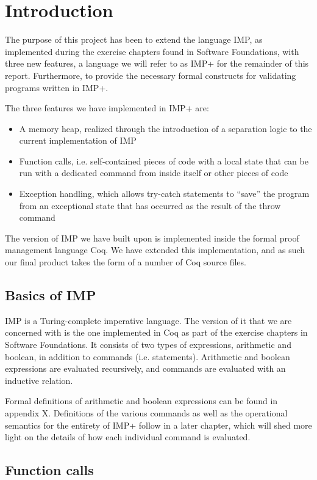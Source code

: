 \section{Introduction}
The purpose of this project has been to extend the language IMP, as implemented during the exercise chapters found in Software Foundations, with three new features, a language we will refer to as IMP+ for the remainder of this report. Furthermore, to provide the necessary formal constructs for validating programs written in IMP+.

The three features we have implemented in IMP+ are:
\begin{itemize}
\item A memory heap, realized through the introduction of a separation logic to the current implementation of IMP
\item Function calls, i.e. self-contained pieces of code with a local state that can be run with a dedicated command from inside itself or other pieces of code
\item Exception handling, which allows try-catch statements to “save” the program from an exceptional state that has occurred as the result of the throw command
\end{itemize}

The version of IMP we have built upon is implemented inside the formal proof management language Coq. We have extended this implementation, and as such our final product takes the form of a number of Coq source files.

\subsection{Basics of IMP}
IMP is a Turing-complete imperative language. The version of it that we are concerned with is the one implemented in Coq as part of the exercise chapters in Software Foundations. It consists of two types of expressions, arithmetic and boolean, in addition to commands (i.e. statements). Arithmetic and boolean expressions are evaluated recursively, and commands are evaluated with an inductive relation.

Formal definitions of arithmetic and boolean expressions can be found in appendix X. Definitions of the various commands as well as the operational semantics for the entirety of IMP+ follow in a later chapter, which will shed more light on the details of how each individual command is evaluated.

\subsection{Function calls}


